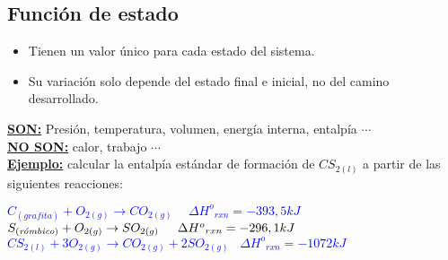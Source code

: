     \subsection{Función de estado}
        \begin{itemize}
            \item Tienen un valor único para cada estado del sistema.
            \item Su variación solo depende del estado final e inicial, no del camino desarrollado.
        \end{itemize}
        \textbf{\underline{SON:}} Presión, temperatura, volumen, energía interna, entalpía $\dotsb$ \\
        \textbf{\underline{NO SON:}} calor, trabajo $\dotsb$ \\[5pt]
        \textbf{\underline{Ejemplo:}} calcular la entalpía estándar de formación de $CS_{2(l)}$ a partir de las siguientes reacciones:
        \begin{center} 
            \textcolor{blue}{ $C_{(grafita)} + O_{2(g)} \rightarrow CO_{2(g)} \hspace{15pt} \Delta {H^o}_{rxn} = -393,5 kJ$ } \\[5pt]
            \textcolor{blue}{ $S_{\text{(\textit{rómbico})}} + O_{2(g)} \rightarrow SO_{2(g)} \hspace{15pt} \Delta {H^o}_{rxn} = -296,1 kJ $ } \\[5pt]
            \textcolor{blue}{ $CS_{2(l)} + 3O_{2(g)} \rightarrow CO_{2(g)} + 2SO_{2(g)} \hspace{10pt} \Delta {H^o}_{rxn} = -1072kJ$ }
        \end{center}
